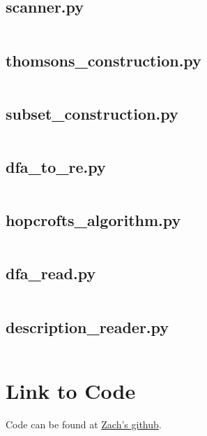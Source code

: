 \documentclass{article}
\begin{document}
\subsection{scanner.py}
\label{code:scanner}
\inputminted{python}{./scanner.py}

\subsection{thomsons\_construction.py}
\label{code:thompsons}
\inputminted{python}{./thomsons_construction.py}

\subsection{subset\_construction.py}
\label{code:subset}
\inputminted{python}{./subset_construction.py}

\subsection{dfa\_to\_re.py}
\label{code:dfaToRe}
\inputminted{python}{./dfa_to_re.py}

\subsection{hopcrofts\_algorithm.py}
\label{code:hopcrofts}
\inputminted{python}{./hopcrofts_algorithm.py}

\subsection{dfa\_read.py}
\label{code:dfaRead}
\inputminted{python}{./dfa_read.py}

\subsection{description\_reader.py}
\label{code:descriptionReader}
\inputminted{python}{./description_reader.py}

\section*{Link to Code}
Code can be found at \href{https://github.com/zinfidel/cs554-project1}{Zach's github}.
\end{document}
